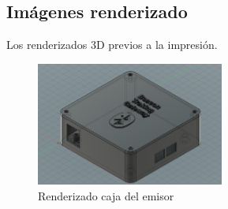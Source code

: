 \documentclass[paper=a4, fontsize=11pt,twoside]{scrartcl}
\begin{document}
        \paragraph{}
        \paragraph{}

    \subsection{Imágenes renderizado}
        Los renderizados 3D previos a la impresión.
        \begin{center}
            \begin{figure}[h]
                \centering
                \includegraphics[width=0.55\textwidth]{../mechanical_master.PNG}
                \caption{Renderizado caja del emisor}
                \label{fig:mesh1}
            \end{figure}
        \end{center}
        \paragraph{}
\end{document}
